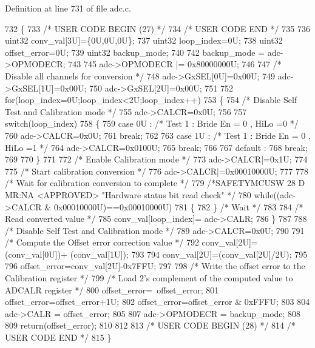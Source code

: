 Definition at line 731 of file adc.\+c.


\begin{DoxyCode}
732 \{
733 \textcolor{comment}{/* USER CODE BEGIN (27) */}
734 \textcolor{comment}{/* USER CODE END */}
735     
736     uint32 conv\_val[3U]=\{0U,0U,0U\};
737     uint32 loop\_index=0U;
738     uint32 offset\_error=0U;
739     uint32 backup\_mode;
740     
742     backup\_mode = adc->OPMODECR;
743     
745     adc->OPMODECR |= 0x80000000U;
746 
747     \textcolor{comment}{/* Disable all channels for conversion */}
748     adc->GxSEL[0U]=0x00U;
749     adc->GxSEL[1U]=0x00U;
750     adc->GxSEL[2U]=0x00U;
751 
752     \textcolor{keywordflow}{for}(loop\_index=0U;loop\_index<2U;loop\_index++)
753     \{
754         \textcolor{comment}{/* Disable Self Test and Calibration mode */}
755         adc->CALCR=0x0U;
756     
757         \textcolor{keywordflow}{switch}(loop\_index)
758         \{
759             \textcolor{keywordflow}{case} 0U :   \textcolor{comment}{/* Test 1 : Bride En = 0 , HiLo =0 */}
760                         adc->CALCR=0x0U;
761                         \textcolor{keywordflow}{break};
762 
763             \textcolor{keywordflow}{case} 1U :   \textcolor{comment}{/* Test 1 : Bride En = 0 , HiLo =1 */}
764                         adc->CALCR=0x0100U;
765                         \textcolor{keywordflow}{break};
766 
767             default :
768                         \textcolor{keywordflow}{break};                      
769 
770         \}
771     
772         \textcolor{comment}{/* Enable Calibration mode */}
773         adc->CALCR|=0x1U;
774     
775         \textcolor{comment}{/* Start calibration conversion */}
776         adc->CALCR|=0x00010000U;
777 
778         \textcolor{comment}{/* Wait for calibration conversion to complete */}
779         \textcolor{comment}{/*SAFETYMCUSW 28 D MR:NA <APPROVED> "Hardware status bit read check" */}
780         \textcolor{keywordflow}{while}((adc->CALCR & 0x00010000U)==0x00010000U)
781         \{ 
782         \} \textcolor{comment}{/* Wait */}
783 
784         \textcolor{comment}{/* Read converted value */}
785         conv\_val[loop\_index]= adc->CALR;
786     \}
787 
788     \textcolor{comment}{/* Disable Self Test and Calibration mode */}
789     adc->CALCR=0x0U;
790 
791     \textcolor{comment}{/* Compute the Offset error correction value */}
792     conv\_val[2U]=(conv\_val[0U])+ (conv\_val[1U]);
793 
794     conv\_val[2U]=(conv\_val[2U]/2U);
795 
796     offset\_error=conv\_val[2U]-0x7FFU;
797 
798     \textcolor{comment}{/* Write the offset error to the Calibration register           */}
799     \textcolor{comment}{/* Load 2's complement of the computed value to ADCALR register */}
800     offset\_error=~offset\_error;
801     offset\_error=offset\_error+1U;
802     offset\_error=offset\_error & 0xFFFU;
803 
804     adc->CALR = offset\_error;
805 
807     adc->OPMODECR = backup\_mode;
808     
809     \textcolor{keywordflow}{return}(offset\_error);
810 
812 
813 \textcolor{comment}{/* USER CODE BEGIN (28) */}
814 \textcolor{comment}{/* USER CODE END */}
815 \}
\end{DoxyCode}

